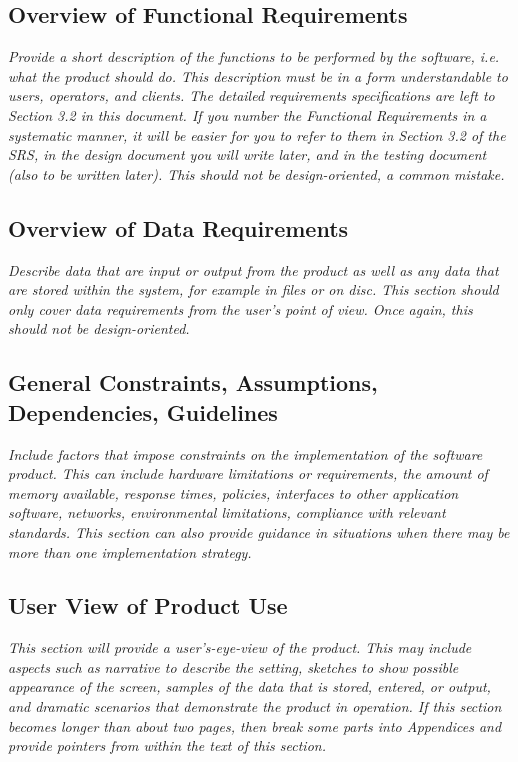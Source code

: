 \documentclass[10pt,a4paper]{article}
\begin{document}
\subsection{Overview of Functional Requirements}
\textit{Provide a short description of the functions to be performed by the software, i.e. what the product should do. This description must be in a form understandable to users, operators, and clients. The detailed requirements specifications are left to Section 3.2 in this document. If you number the Functional Requirements in a systematic manner, it will be easier for you to refer to them in Section 3.2 of the SRS, in the design document you will write later, and in the testing document (also to be written later). This should not be design-oriented, a common mistake.}

\subsection{Overview of Data Requirements}
\textit{Describe data that are input or output from the product as well as any data that are stored within the system, for example in files or on disc. This section should only cover data requirements from the user's point of view. \newline\newline
Once again, this should not be design-oriented.}

\subsection{General Constraints, Assumptions, Dependencies, Guidelines}
\textit{Include factors that impose constraints on the implementation of the software product. This can include hardware limitations or requirements, the amount of memory available, response times, policies, interfaces to other application software, networks, environmental limitations, compliance with relevant standards. This section can also provide guidance in situations when there may be more than one implementation strategy.}

\subsection{User View of Product Use}
\textit{This section will provide a user's-eye-view of the product.
This may include aspects such as narrative to describe the setting, sketches to show possible appearance of the screen, samples of the data that is stored, entered, or output, and dramatic scenarios that demonstrate the product in operation. If this section becomes longer than about two pages, then break some parts into Appendices and provide pointers from within the text of this section.
}
\end{document}
